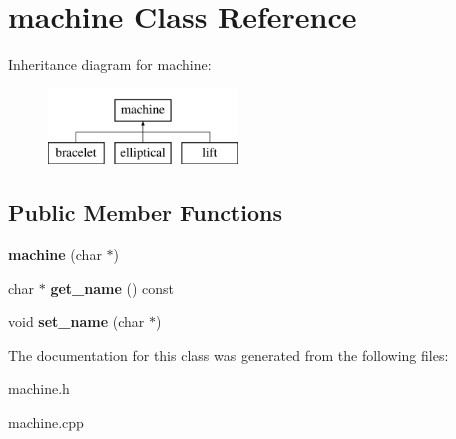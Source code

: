 \hypertarget{classmachine}{\section{machine Class Reference}
\label{classmachine}
}
Inheritance diagram for machine\-:\begin{figure}[H]
\begin{center}
\leavevmode
\includegraphics[height=2.000000cm]{classmachine}
\end{center}
\end{figure}
\subsection*{Public Member Functions}
\begin{DoxyCompactItemize}
\item 
\hypertarget{classmachine_a81478e4b10a43f11dfbae0a97fcf45f0}{{\bfseries machine} (char $\ast$)}\label{classmachine_a81478e4b10a43f11dfbae0a97fcf45f0}

\item 
\hypertarget{classmachine_ab6d31aed298853d4fb32ac21af6ac8da}{char $\ast$ {\bfseries get\-\_\-name} () const }\label{classmachine_ab6d31aed298853d4fb32ac21af6ac8da}

\item 
\hypertarget{classmachine_a5eeea1ff9c2869aca7088918cca2d8f7}{void {\bfseries set\-\_\-name} (char $\ast$)}\label{classmachine_a5eeea1ff9c2869aca7088918cca2d8f7}

\end{DoxyCompactItemize}


The documentation for this class was generated from the following files\-:\begin{DoxyCompactItemize}
\item 
machine.\-h\item 
machine.\-cpp\end{DoxyCompactItemize}

